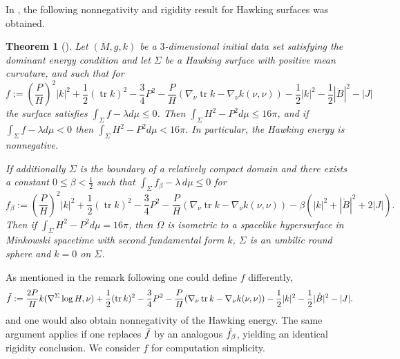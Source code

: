 \documentclass[12pt,a4paper]{amsart}
\theoremstyle{plain}
\newtheorem{theorem}{Theorem}[section]
\theoremstyle{definition}
\newcommand{\tr}{\operatorname{tr}}
\begin{document}
 In \cite{rigidiaz}, the following nonnegativity and rigidity result for Hawking surfaces was obtained. 
\begin{theorem}[{\cite[Theorem 3.6]{rigidiaz}}]\label{positivity0}
    Let $(M,g,k)$ be a $3$-dimensional initial data set satisfying the dominant energy condition and let $\Sigma$ be a Hawking surface with positive mean curvature, and such that for 
    \begin{equation}
        f:= \left( \frac{P}{H}\right)^2|k|^2+ \frac{1}{2 }(\tr k)^2    - \frac{3}{4} P^2- \frac{P}{H}( \nabla_\nu \tr k - \nabla_\nu k(\nu,\nu )) -  \frac{1}{2} |k|^2  -\frac{1}{2} |\mathring{B}|^2 -|J|
    \end{equation}
    the surface satisfies $\int_\Sigma f -\lambda d\mu \leq 0$. Then $\int_\Sigma H^2 -P^2 d\mu \leq 16\pi $, and  if $\int_\Sigma f -\lambda d\mu < 0$ then  $\int_\Sigma H^2 -P^2 d\mu < 16\pi $. In particular, the Hawking energy is nonnegative.

If additionally  $\Sigma $ is the boundary of a relatively compact domain  and there exists a constant $0\leq\beta <\frac{1}{2}$ such that $\int_\Sigma f_\beta -\lambda \, d\mu \leq 0$  for 
 \begin{equation}
        f_\beta:= \left( \frac{P}{H}\right)^2|k|^2+ \frac{1}{2 }(\tr k)^2   - \frac{3}{4} P^2- \frac{P}{H}( \nabla_\nu \tr k - \nabla_\nu k(\nu,\nu ))  -  \beta( |k|^2 + |\mathring{B}|^2 +2|J|).
    \end{equation}
Then if $\int_\Sigma H^2 -P^2 d\mu = 16\pi $, then   $\Omega$ is isometric to a spacelike hypersurface in Minkowski
spacetime with second fundamental form  $k$, $\Sigma$ is an umbilic round sphere and $k=0$ on $\Sigma$.
\end{theorem}
As mentioned in the remark following \cite[Theorem 3.6]{rigidiaz}   one could define $f$ differently, 
\begin{equation}\label{ftil}
    \Tilde{f}:= \frac{2P}{H}  k(\nabla^\Sigma \log H, \nu)+ \frac{1}{2 }(\tr k)^2    - \frac{3}{4} P^2- \frac{P}{H}( \nabla_\nu \tr k - \nabla_\nu k(\nu,\nu )) -  \frac{1}{2} |k|^2  -\frac{1}{2} |\mathring{B}|^2 -|J|.
\end{equation}
and one would also obtain nonnegativity of the Hawking energy. The same argument applies if one replaces $ \Tilde{f}$ by an  analogous   $ \Tilde{f}_{\beta}$, yielding an identical rigidity conclusion. We consider $f$ for computation simplicity. 


 
\end{document}
